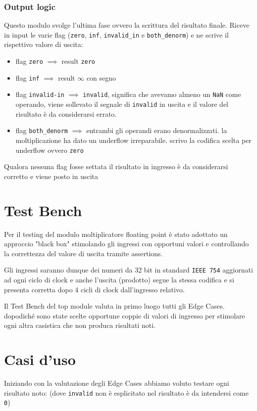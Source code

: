 \documentclass[twoside,11pt]{article}
\begin{document}
{\subsubsection{Output logic}
Questo modulo svolge l’ultima fase ovvero la scrittura del risultato finale. Riceve in input le varie flag (\verb|zero|, \verb|inf|, \verb|invalid_in| e \verb|both_denorm|) e ne scrive il rispettivo valore di uscita:
\begin{itemize}[noitemsep]
    \item flag \verb|zero| $\implies$ result \verb|zero|
    \item flag \verb|inf| $\implies$ result $\infty$ con segno
    \item flag \verb|invalid-in| $\implies$ \verb|invalid|, significa che avevamo almeno un \verb|NaN| come operando, viene sollevato il segnale di \verb|invalid| in uscita e il valore del risultato è da considerarsi errato.
    \item flag \verb|both_denorm| $\implies$ entrambi gli operandi erano denormalizzati. la moltiplicazione ha dato un underflow irreparabile. scrivo la codifica scelta per underflow ovvero \verb|zero|
\end{itemize}
Qualora nessuna flag fosse settata il risultato in ingresso è da considerarsi corretto e viene posto in uscita


\newpage

\section{Test Bench}
Per il testing del modulo moltiplicatore floating point è stato adottato un approccio "black box" stimolando gli ingressi con opportuni valori e controllando la correttezza del valore di uscita tramite assertions.

Gli ingressi saranno dunque dei numeri da 32 bit in standard \verb|IEEE 754| aggiornati ad ogni ciclo di clock e anche l’uscita (prodotto) segue la stessa codifica e si presenta corretta dopo 4 cicli di clock dall'ingresso relativo.

Il Test Bench del top module valuta in primo luogo tutti gli Edge Cases. dopodiché sono state scelte opportune coppie di valori di ingresso per stimolare ogni altra casistica che non produca risultati noti.

\section{Casi d'uso}
Iniziando con la valutazione degli Edge Cases abbiamo voluto testare ogni risultato noto: (dove \verb|invalid| non è esplicitato nel risultato è  da intendersi come \verb|0|)

}
\end{document}
